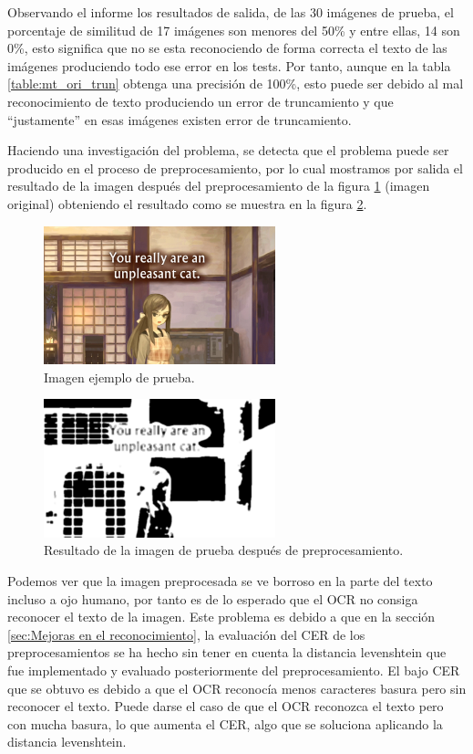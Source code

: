 Observando el informe los resultados de salida, de las 30 imágenes de prueba, el porcentaje de similitud de 17 imágenes son menores del 50\% y entre ellas, 14 son 0\%, esto significa que no se esta reconociendo de forma correcta el texto de las imágenes produciendo todo ese error en los tests. Por tanto, aunque en la tabla \ref{table:mt_ori_trun} obtenga una precisión de 100\%, esto puede ser debido al mal reconocimiento de texto produciendo un error de truncamiento y que ``justamente'' en esas imágenes existen error de truncamiento.

Haciendo una investigación del problema, se detecta que el problema puede ser producido en el proceso de preprocesamiento, por lo cual mostramos por salida el resultado de la imagen después del preprocesamiento de la figura \ref{fig:Eva_2} (imagen original) obteniendo el resultado como se muestra en la figura \ref{fig:Eva_2P}.
\begin{figure}[H]
	\centering
	\includegraphics[width = 0.6\textwidth]{Imagenes/Evaluacion_OCR/2.png}
	\caption{Imagen ejemplo de prueba.}
	\label{fig:Eva_2}
\end{figure}
\begin{figure}[H]
	\centering
	\includegraphics[width = 0.6\textwidth]{Imagenes/Evaluacion_OCR/2_prepro.png}
	\caption{Resultado de la imagen de prueba después de preprocesamiento.}
	\label{fig:Eva_2P}
\end{figure}

Podemos ver que la imagen preprocesada se ve borroso en la parte del texto incluso a ojo humano, por tanto es de lo esperado que el OCR no consiga reconocer el texto de la imagen.
Este problema es debido a que en la sección \ref{sec:Mejoras en el reconocimiento}, la evaluación del CER de los preprocesamientos se ha hecho sin tener en cuenta la distancia levenshtein que fue implementado y evaluado posteriormente del preprocesamiento. El bajo CER que se obtuvo es debido a que el OCR reconocía menos caracteres basura pero sin reconocer el texto. Puede darse el caso de que el OCR reconozca el texto pero con mucha basura, lo que  aumenta el CER, algo que se soluciona aplicando la distancia levenshtein.

